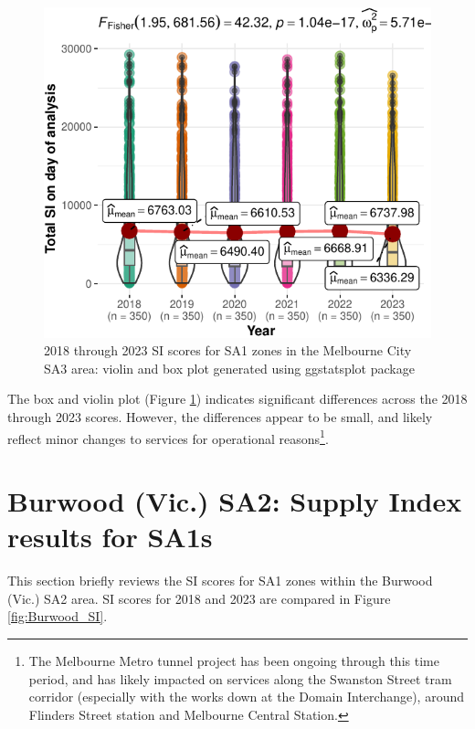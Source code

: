 \documentclass[]{tufte-book}
\begin{document}
\begin{figure}
\includegraphics{Reynolds_Currie_2024_transit_supply_index_GTFS_files/figure-latex/Compare_2018_2023_Melbourne_City_within_stats-1} \caption[2018 through 2023 SI scores for SA1 zones in the Melbourne City SA3 area]{2018 through 2023 SI scores for SA1 zones in the Melbourne City SA3 area: violin and box plot generated using ggstatsplot package}\label{fig:Compare_2018_2023_Melbourne_City_within_stats}
\end{figure}

The box and violin plot (Figure
\ref{fig:Compare_2018_2023_Melbourne_City_within_stats}) indicates
significant differences across the 2018 through 2023 scores. However,
the differences appear to be small, and likely reflect minor changes to
services for operational reasons\footnote{The Melbourne Metro tunnel
  project has been ongoing through this time period, and has likely
  impacted on services along the Swanston Street tram corridor
  (especially with the works down at the Domain Interchange), around
  Flinders Street station and Melbourne Central Station.}.

\hypertarget{burwood-vic.-sa2-supply-index-results-for-sa1s}{%
\section{Burwood (Vic.) SA2: Supply Index results for
SA1s}\label{burwood-vic.-sa2-supply-index-results-for-sa1s}}

This section briefly reviews the SI scores for SA1 zones within the
Burwood (Vic.) SA2 area. SI scores for 2018 and 2023 are compared in
Figure \ref{fig:Burwood_SI}.
\end{document}
